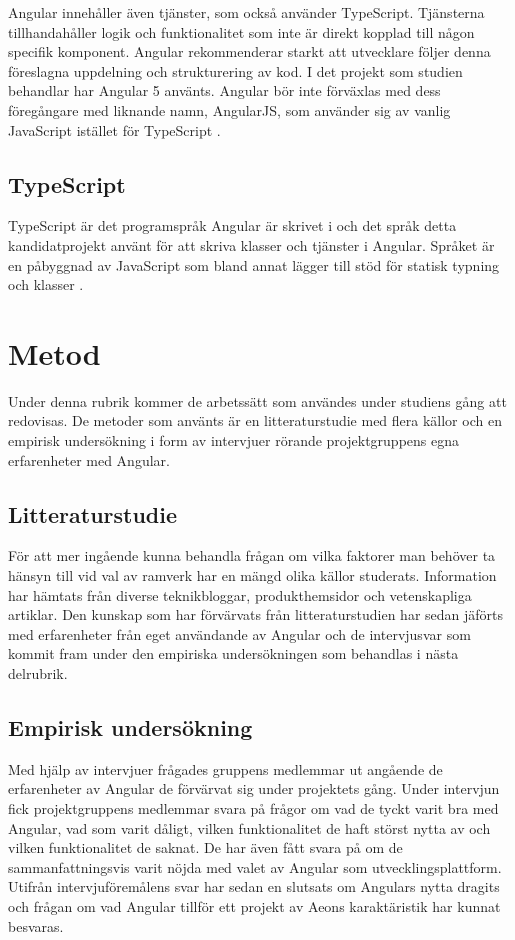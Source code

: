 Angular innehåller även tjänster, som också använder TypeScript. Tjänsterna tillhandahåller logik och funktionalitet som inte är direkt kopplad till någon specifik komponent. Angular rekommenderar starkt att utvecklare följer denna föreslagna uppdelning och strukturering av kod. I det projekt som studien behandlar har Angular 5 använts. Angular bör inte förväxlas med dess föregångare med liknande namn, AngularJS, som använder sig av vanlig JavaScript istället för TypeScript \cite{angularguide}.


\subsection{TypeScript}

TypeScript är det programspråk Angular är skrivet i och det språk detta kandidatprojekt använt för att skriva klasser och tjänster i Angular. Språket är en påbyggnad av JavaScript som bland annat lägger till stöd för statisk typning och klasser \cite{henrik_ts1}.


\section{Metod}

Under denna rubrik kommer de arbetssätt som användes under studiens gång att redovisas. De metoder som använts är en litteraturstudie med flera källor och en empirisk undersökning i form av intervjuer rörande projektgruppens egna erfarenheter med Angular.

\subsection{Litteraturstudie}

För att mer ingående kunna behandla frågan om vilka faktorer man behöver ta hänsyn till vid val av ramverk har en mängd olika källor studerats. Information har hämtats från diverse teknikbloggar, produkthemsidor och vetenskapliga artiklar. Den kunskap som har förvärvats från litteraturstudien har sedan jäförts med erfarenheter från eget användande av Angular och de intervjusvar som kommit fram under den empiriska undersökningen som behandlas i nästa delrubrik.

\subsection{Empirisk undersökning} 

Med hjälp av intervjuer frågades gruppens medlemmar ut angående de erfarenheter av Angular de förvärvat sig under projektets gång. Under intervjun fick projektgruppens medlemmar svara på frågor om vad de tyckt varit bra med Angular, vad som varit dåligt, vilken funktionalitet de haft störst nytta av och vilken funktionalitet de saknat. De har även fått svara på om de sammanfattningsvis varit nöjda med valet av Angular som utvecklingsplattform. Utifrån intervjuföremålens svar har sedan en slutsats om Angulars nytta dragits och frågan om vad Angular tillför ett projekt av Aeons karaktäristik har kunnat besvaras.

